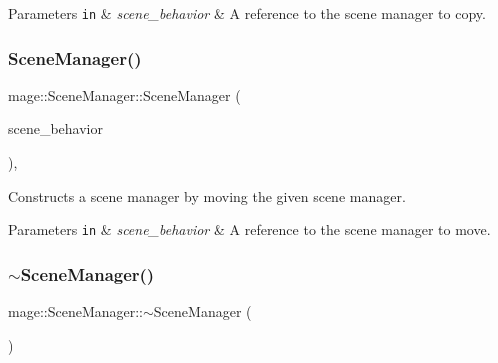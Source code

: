 \begin{DoxyParams}[1]{Parameters}
\mbox{\tt in}  & {\em scene\+\_\+behavior} & A reference to the scene manager to copy. \\
\hline
\end{DoxyParams}
\hypertarget{classmage_1_1_scene_manager_a651c58791268cf29d33c18031e4c1f41}{}\label{classmage_1_1_scene_manager_a651c58791268cf29d33c18031e4c1f41} 
\subsubsection{\texorpdfstring{Scene\+Manager()}{SceneManager()}\hspace{0.1cm}{\footnotesize\ttfamily [3/3]}}
{\footnotesize\ttfamily mage\+::\+Scene\+Manager\+::\+Scene\+Manager (\begin{DoxyParamCaption}\item[{\hyperlink{classmage_1_1_scene_manager}{Scene\+Manager} \&\&}]{scene\+\_\+behavior }\end{DoxyParamCaption})\hspace{0.3cm}{\ttfamily [default]}, {\ttfamily [noexcept]}}

Constructs a scene manager by moving the given scene manager.


\begin{DoxyParams}[1]{Parameters}
\mbox{\tt in}  & {\em scene\+\_\+behavior} & A reference to the scene manager to move. \\
\hline
\end{DoxyParams}
\hypertarget{classmage_1_1_scene_manager_a849386b052d6ae8945c9554f888e1707}{}\label{classmage_1_1_scene_manager_a849386b052d6ae8945c9554f888e1707} 
\subsubsection{\texorpdfstring{$\sim$\+Scene\+Manager()}{~SceneManager()}}
{\footnotesize\ttfamily mage\+::\+Scene\+Manager\+::$\sim$\+Scene\+Manager (\begin{DoxyParamCaption}{ }\end{DoxyParamCaption})\hspace{0.3cm}{\ttfamily [default]}}

